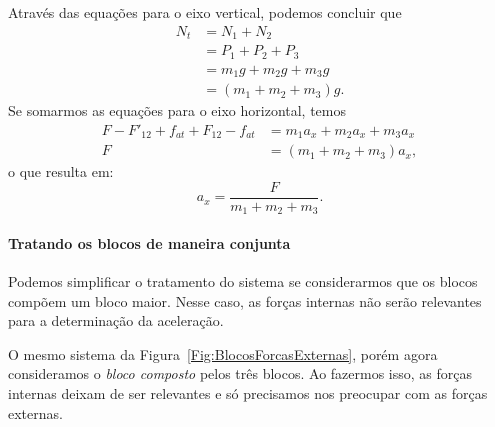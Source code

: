 \noindent{}Através das equações para o eixo vertical, podemos concluir que
\begin{align}
    N_t &= N_1 + N_2 \\
    &= P_1 + P_2 + P_3\\
    &= m_1g + m_2g + m_3g\\
    &= (m_1 + m_2 + m_3)g.
\end{align}
%
Se somarmos as equações para o eixo horizontal, temos
\begin{align}
    F - F'_{12} + f_{at} + F_{12} - f_{at} &= m_1 a_x + m_2 a_x + m_3 a_x \\
    F &= (m_1 + m_2 + m_3) a_x,
\end{align}
%
o que resulta em:
\begin{equation}
    a_x = \frac{F}{m_1 + m_2 + m_3}.
\end{equation}

\paragraph{Tratando os blocos de maneira conjunta}

Podemos simplificar o tratamento do sistema se considerarmos que os blocos compõem um bloco maior. Nesse caso, as forças internas não serão relevantes para a determinação da aceleração.

\begin{marginfigure}[4cm]
\centering
{}
\caption{O mesmo sistema da Figura~\ref{Fig:BlocosForcasExternas}, porém agora consideramos o \emph{bloco composto} pelos três blocos. Ao fazermos isso, as forças internas deixam de ser relevantes e só precisamos nos preocupar com as forças externas.\label{Fig:BlocosForcasExternasComposto}}
\end{marginfigure}

